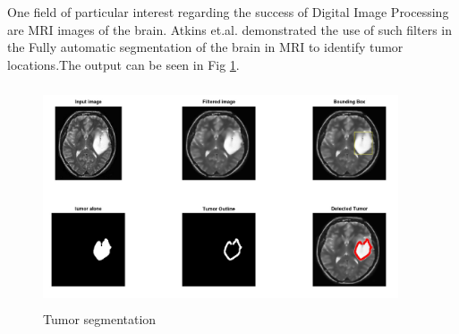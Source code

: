 \documentclass[19pt]{article}
\begin{document}
One field of particular interest regarding the success of Digital Image Processing are MRI images of the brain. Atkins et.al. \cite{atkins1998fully} demonstrated the use of such filters in the Fully automatic segmentation of the brain in MRI to identify tumor locations.The output can be seen in Fig \ref{fig:4}. 

\begin{center}
    \begin{figure}[!h!t!b]
        \centerline{\includegraphics[width=105mm,height=65mm]{images/mri.jpeg}}
        \caption{Tumor segmentation}
        \label{fig:4}
    \end{figure}
\end{center}
 
\newpage
  


\end{document}
